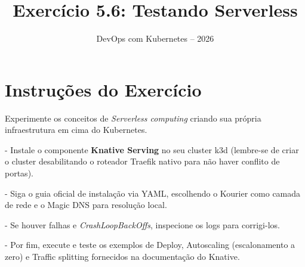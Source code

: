 \documentclass[11pt,a4paper]{article}
\title{\color{secondary}\Huge\textbf{Exercício 5.6: Testando Serverless}}
\author{\color{primary}DevOps com Kubernetes -- 2026}
\date{}
\begin{document}
\maketitle

\section*{\color{primary}Instruções do Exercício}
\begin{tcolorbox}[colback=blue!5!white,colframe=blue!75!black,title=Exercício 5.6: Testando Serverless]
Experimente os conceitos de \textit{Serverless computing} criando sua própria infraestrutura em cima do Kubernetes.

- Instale o componente \textbf{Knative Serving} no seu cluster k3d (lembre-se de criar o cluster desabilitando o roteador Traefik nativo para não haver conflito de portas).

- Siga o guia oficial de instalação via YAML, escolhendo o Kourier como camada de rede e o Magic DNS para resolução local.

- Se houver falhas e \textit{CrashLoopBackOffs}, inspecione os logs para corrigi-los.

- Por fim, execute e teste os exemplos de Deploy, Autoscaling (escalonamento a zero) e Traffic splitting fornecidos na documentação do Knative.
\end{tcolorbox}
\end{document}
